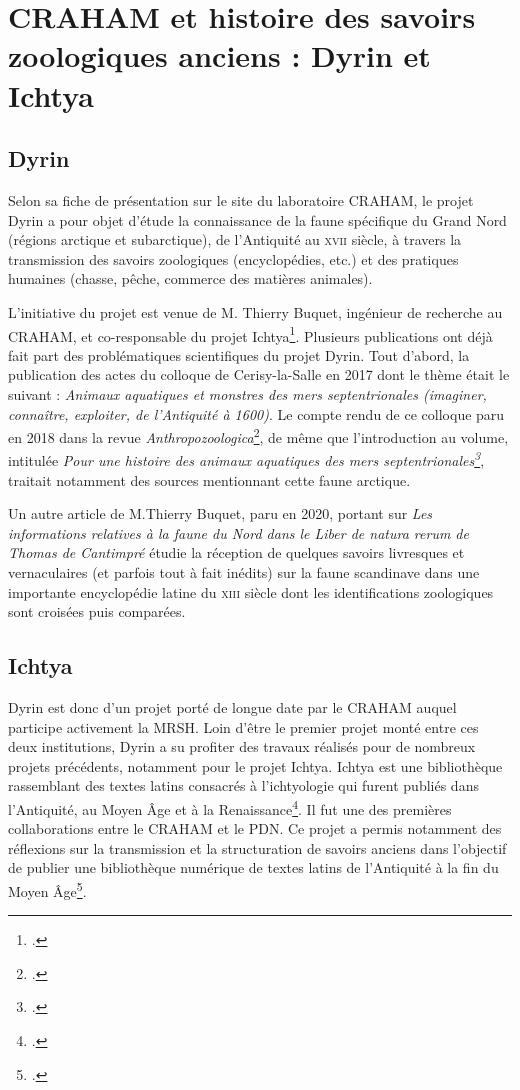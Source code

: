 \documentclass[a4paper,12pt,twoside]{book}
\begin{document}
\chapter{CRAHAM et histoire des savoirs zoologiques anciens : Dyrin et Ichtya}
    \section{Dyrin}
    Selon sa fiche de présentation sur le site du laboratoire \acrshort{CRAHAM}, le projet Dyrin a pour objet d'étude \og la connaissance de la faune spécifique du Grand Nord (régions arctique et subarctique), de l'Antiquité au \textsc{xvii}\ieme{} siècle, à travers la transmission des savoirs zoologiques (encyclopédies, etc.) et des pratiques humaines (chasse, pêche, commerce des matières animales)\fg.
    
   L'initiative du projet est venue de M. Thierry Buquet, ingénieur de recherche au \acrshort{CRAHAM}, et co-responsable du projet Ichtya\footcite{ichtya}. Plusieurs publications ont déjà fait part des problématiques scientifiques du projet Dyrin. Tout d'abord, la publication des actes du colloque de Cerisy-la-Salle en 2017 dont le thème était le suivant : \og \textit{Animaux aquatiques et monstres des mers septentrionales (imaginer, connaître, exploiter, de l'Antiquité à 1600)}\fg. Le compte rendu de ce colloque paru en 2018 dans la revue \textit{Anthropozoologica}\footcite{aquatique}, de même que l'introduction au volume, intitulée \og \textit{Pour une histoire des animaux aquatiques des mers septentrionales\footcite{natura}}\fg, traitait notamment des sources mentionnant cette faune arctique.
   
   Un autre article de M.Thierry Buquet, paru en 2020, portant sur \og \textit{Les informations relatives à la faune du Nord dans le Liber de natura rerum de Thomas de Cantimpré}\fg{} étudie la réception de quelques savoirs livresques et vernaculaires (et parfois tout à fait inédits) sur la faune scandinave dans une importante encyclopédie latine du \textsc{xiii}\ieme{} siècle dont les identifications zoologiques sont croisées puis comparées.
   
    \section{Ichtya}
   Dyrin est donc d'un projet porté de longue date par le \acrshort{CRAHAM} auquel participe activement la \acrfull{MRSH}. Loin d'être le premier projet monté entre ces deux institutions, Dyrin a su profiter des travaux réalisés pour de nombreux projets précédents, notamment pour le projet Ichtya. Ichtya est une bibliothèque rassemblant des textes latins consacrés à l'ichtyologie qui furent publiés dans l'Antiquité, au Moyen Âge et à la Renaissance\footcite{ichtya}. Il fut une des premières collaborations entre le \acrshort{CRAHAM} et le \acrshort{PDN}. Ce projet a permis notamment des
   réflexions sur la transmission et la structuration de savoirs anciens dans l'objectif de publier une bibliothèque numérique de textes latins de l'Antiquité à la fin du Moyen Âge\footcite{buquet_ichtya_nodate}.
   
\end{document}
